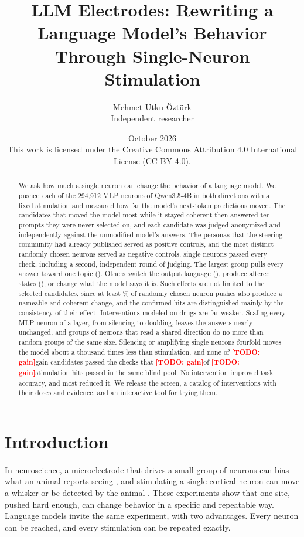 \documentclass[11pt]{article}
\title{LLM Electrodes: Rewriting a Language Model's Behavior\\Through Single-Neuron Stimulation}
\author{Mehmet Utku Öztürk\\[2pt]{\normalsize Independent researcher}}
\date{October 2026\\[6pt]{\small This work is licensed under the Creative Commons Attribution 4.0 International License (CC BY 4.0).}}
\providecommand{\GainScreenJudged}{\todo{gain}}\providecommand{\GainScreenHits}{\todo{gain}}
\providecommand{\GainControlJudged}{\todo{gain}}\providecommand{\GainControlHits}{\todo{gain}}
\newcommand{\todo}[1]{\textcolor{red}{\textbf{[TODO: #1]}}}
\begin{document}
\maketitle

\begin{abstract}
We ask how much a single neuron can change the behavior of a language model. We pushed each of the 294,912 MLP
neurons of Qwen3.5-4B in both directions with a fixed stimulation and measured how far the model's next-token
predictions moved. The candidates that moved the model most while it stayed coherent then answered ten prompts they
were never selected on, and each candidate was judged anonymized and independently against the unmodified model's
answers. The
\NCatalogJudged personas that the steering community had already published served as positive controls, and the most distinct
randomly chosen neurons served as negative controls. \NHits single neurons passed every check, including a second,
independent round of judging. The largest group pulls every answer toward one topic (\KindTopicpull{}). Others
switch the output language (\KindLanguage{}), produce altered states (\KindAlteredstate{}), or change what the model
says it is.
Such effects are not limited to the selected candidates, since at least \BaseRate\% of randomly chosen neuron pushes
also produce a nameable and coherent change, and the confirmed hits are distinguished mainly by the consistency of
their effect. Interventions modeled on drugs are far weaker. Scaling every MLP neuron of a layer, from silencing to
doubling, leaves the answers nearly unchanged,
and groups of neurons that read a shared direction do no more than random groups of the same size. Silencing or
amplifying single neurons fourfold moves the model about a thousand times less than stimulation, and none of
\GainScreenJudged gain candidates passed the checks that \GainControlHits of \GainControlJudged stimulation hits passed in the
same blind pool. No intervention improved task accuracy, and most reduced it. We release
the screen, a catalog of \NCatalogEntries interventions with their doses and evidence, and an interactive tool for trying them.
\end{abstract}

\section{Introduction}

In neuroscience, a microelectrode that drives a small group of neurons can bias what an animal reports seeing
\citep{salzman1990microstimulation}, and stimulating a single cortical neuron can move a whisker or be detected by the
animal \citep{brecht2004whisker,houweling2008single}. These experiments show that one site, pushed hard enough, can
change behavior in a specific and repeatable way. Language models invite the same experiment, with two advantages.
Every neuron can be reached, and every stimulation can be repeated exactly.
\end{document}
